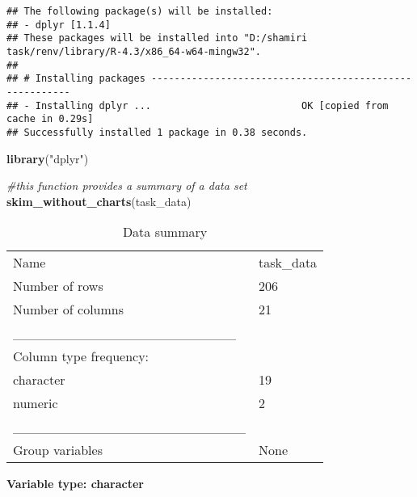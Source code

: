 \documentclass[
]{article}
\newenvironment{Shaded}{\begin{snugshade}}{\end{snugshade}}
\newcommand{\CommentTok}[1]{\textcolor[rgb]{0.56,0.35,0.01}{\textit{#1}}}
\newcommand{\FunctionTok}[1]{\textcolor[rgb]{0.13,0.29,0.53}{\textbf{#1}}}
\newcommand{\NormalTok}[1]{#1}
\newcommand{\StringTok}[1]{\textcolor[rgb]{0.31,0.60,0.02}{#1}}
\begin{document}
\begin{verbatim}
## The following package(s) will be installed:
## - dplyr [1.1.4]
## These packages will be installed into "D:/shamiri task/renv/library/R-4.3/x86_64-w64-mingw32".
## 
## # Installing packages --------------------------------------------------------
## - Installing dplyr ...                          OK [copied from cache in 0.29s]
## Successfully installed 1 package in 0.38 seconds.
\end{verbatim}

\begin{Shaded}
\begin{Highlighting}[]
\FunctionTok{library}\NormalTok{(}\StringTok{"dplyr"}\NormalTok{)}

\CommentTok{\#this function provides a summary of a data set}
\FunctionTok{skim\_without\_charts}\NormalTok{(task\_data)}
\end{Highlighting}
\end{Shaded}

\begin{longtable}[]{@{}ll@{}}
\caption{Data summary}\tabularnewline
\toprule\noalign{}
\endfirsthead
\endhead
\bottomrule\noalign{}
\endlastfoot
Name & task\_data \\
Number of rows & 206 \\
Number of columns & 21 \\
\_\_\_\_\_\_\_\_\_\_\_\_\_\_\_\_\_\_\_\_\_\_\_ & \\
Column type frequency: & \\
character & 19 \\
numeric & 2 \\
\_\_\_\_\_\_\_\_\_\_\_\_\_\_\_\_\_\_\_\_\_\_\_\_ & \\
Group variables & None \\
\end{longtable}

\textbf{Variable type: character}
\end{document}
